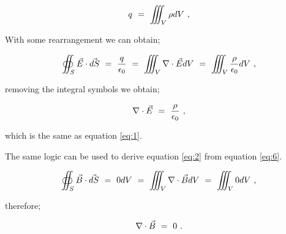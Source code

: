 \documentclass{article}
\begin{document}
\begin{equation} \label{eq:25}
q \hspace{0.125cm} = \hspace{0.125cm} \iiint_V \rho dV \hspace{0.125cm} , 
\end{equation} 

With some rearrangement we can obtain;

\begin{equation} \label{eq:26}
\oiint_S \vec{E}\cdot\vec{dS} \hspace{0.125cm} = \hspace{0.125cm} \frac{q}{\epsilon_0} \hspace{0.125cm} = \hspace{0.125cm} \iiint_V \nabla\cdot\vec{E}dV \hspace{0.125cm} = \hspace{0.125cm} \iiint_V \frac{\rho}{\epsilon_{0}}dV \hspace{0.125cm} , 
\end{equation}

removing the integral symbols we obtain;

\begin{equation} \label{eq:27}
\nabla\cdot\vec{E} \hspace{0.125cm} = \hspace{0.125cm} \frac{\rho}{\epsilon_{0}} \hspace{0.125cm} , 
\end{equation}

which is the same as equation \ref{eq:1}. 

The same logic can be used to derive equation \ref{eq:2} from equation \ref{eq:6}.

\begin{equation} \label{eq:28}
\oiint_S \vec{B}\cdot\vec{dS} \hspace{0.125cm} = \hspace{0.125cm} 0dV \hspace{0.125cm} = \hspace{0.125cm} \iiint_V \nabla\cdot\vec{B}dV \hspace{0.125cm} = \hspace{0.125cm} \iiint_V 0dV \hspace{0.125cm} , 
\end{equation}

therefore;

\begin{equation} \label{eq:29}
\nabla\cdot\vec{B} \hspace{0.125cm} = \hspace{0.125cm} 0 \hspace{0.125cm} .
\end{equation}
\end{document}

